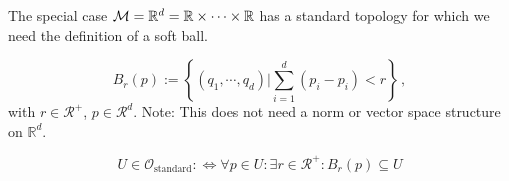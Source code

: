 \documentclass[11pt, a4paper, twocolumn]{article} %
\begin{document}
The special case $\mathcal{M} = \mathbb{R}^d = \mathbb{R} \times \cdots \times \mathbb{R}$ has a standard topology
for which we need the definition of a soft ball.
\begin{defn}
   \begin{equation}
       B_r(p) := \left\{ (q_1,\cdots,q_d)| \sum_{i=1}^{d}(p_i-p_i) < r \right\}\,,
   \end{equation} 
   with $r\in \mathcal{R}^+$, $p\in\mathcal{R}^d$.
   Note: This does not need a norm or vector space structure on $\mathbb{R}^d$.
\end{defn}
\begin{defn}
    \begin{equation}
        U \in \mathcal{O}_\text{standard} :\Leftrightarrow \forall p\in U:
        \exists r\in\mathcal{R}^+ : B_r(p) \subseteq U
    \end{equation}
\end{defn}



\printbibliography[title={Bibliography}] %

\end{document}
